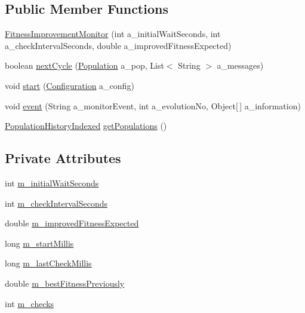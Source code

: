 \subsection*{Public Member Functions}
\begin{DoxyCompactItemize}
\item 
\hyperlink{classorg_1_1jgap_1_1audit_1_1_fitness_improvement_monitor_ae19a77175afbea38a2ea749846c40307}{Fitness\-Improvement\-Monitor} (int a\-\_\-initial\-Wait\-Seconds, int a\-\_\-check\-Interval\-Seconds, double a\-\_\-improved\-Fitness\-Expected)
\item 
boolean \hyperlink{classorg_1_1jgap_1_1audit_1_1_fitness_improvement_monitor_a0d58e057a3bd7dfb3c71d97ac1840e3c}{next\-Cycle} (\hyperlink{classorg_1_1jgap_1_1_population}{Population} a\-\_\-pop, List$<$ String $>$ a\-\_\-messages)
\item 
void \hyperlink{classorg_1_1jgap_1_1audit_1_1_fitness_improvement_monitor_ad6cb6476edbc08de0e1864d470d225e3}{start} (\hyperlink{classorg_1_1jgap_1_1_configuration}{Configuration} a\-\_\-config)
\item 
void \hyperlink{classorg_1_1jgap_1_1audit_1_1_fitness_improvement_monitor_ac22e264ce9dcdffa3dcd1222f247a4bb}{event} (String a\-\_\-monitor\-Event, int a\-\_\-evolution\-No, Object\mbox{[}$\,$\mbox{]} a\-\_\-information)
\item 
\hyperlink{classorg_1_1jgap_1_1eval_1_1_population_history_indexed}{Population\-History\-Indexed} \hyperlink{classorg_1_1jgap_1_1audit_1_1_fitness_improvement_monitor_ae28fcbc136dd51afd357bff198946fa3}{get\-Populations} ()
\end{DoxyCompactItemize}
\subsection*{Private Attributes}
\begin{DoxyCompactItemize}
\item 
int \hyperlink{classorg_1_1jgap_1_1audit_1_1_fitness_improvement_monitor_a0cf4e59761f691dcd738a93fbd4f636c}{m\-\_\-initial\-Wait\-Seconds}
\item 
int \hyperlink{classorg_1_1jgap_1_1audit_1_1_fitness_improvement_monitor_a65daf141a1c712887451c66c1458d7b3}{m\-\_\-check\-Interval\-Seconds}
\item 
double \hyperlink{classorg_1_1jgap_1_1audit_1_1_fitness_improvement_monitor_a80dc25a60d6f8c8838da7a1115940efe}{m\-\_\-improved\-Fitness\-Expected}
\item 
long \hyperlink{classorg_1_1jgap_1_1audit_1_1_fitness_improvement_monitor_ac8b211f118012e643b3ac1beebe065e4}{m\-\_\-start\-Millis}
\item 
long \hyperlink{classorg_1_1jgap_1_1audit_1_1_fitness_improvement_monitor_a5a5a7e91e7951e2cd6c38ca70c288245}{m\-\_\-last\-Check\-Millis}
\item 
double \hyperlink{classorg_1_1jgap_1_1audit_1_1_fitness_improvement_monitor_a30c75ab12250e7ce484b14b6f574dc2e}{m\-\_\-best\-Fitness\-Previously}
\item 
int \hyperlink{classorg_1_1jgap_1_1audit_1_1_fitness_improvement_monitor_a84a7f22d4233579be20a91192a4d0338}{m\-\_\-checks}
\end{DoxyCompactItemize}
